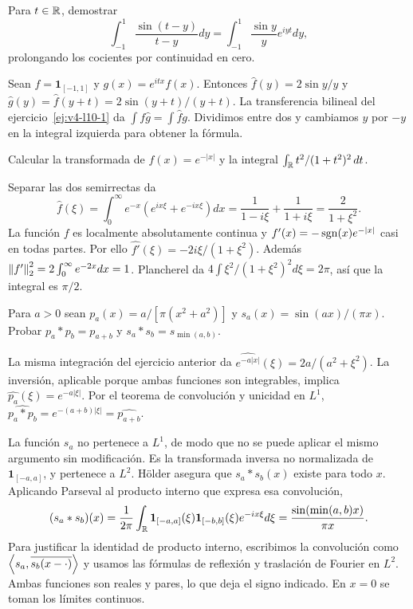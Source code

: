 \begin{ejercicio}\label{ej:v4-l13-1}
Para $t\in\mathbb R$, demostrar
\[
 \int_{-1}^1\frac{\sin(t-y)}{t-y}dy
 =\int_{-1}^1\frac{\sin y}{y}e^{iyt}dy,
\]
prolongando los cocientes por continuidad en cero.
\end{ejercicio}
\begin{solucion}
Sean $f=\mathbf1_{[-1,1]}$ y $g(x)=e^{itx}f(x)$. Entonces $\widehat f(y)=2\sin y/y$ y $\widehat g(y)=\widehat f(y+t)=2\sin(y+t)/(y+t)$. La transferencia bilineal del ejercicio~\ref{ej:v4-l10-1} da $\int f\widehat g=\int\widehat f g$. Dividimos entre dos y cambiamos $y$ por $-y$ en la integral izquierda para obtener la fórmula.
\end{solucion}

\begin{ejercicio}\label{ej:v4-l13-2}
Calcular la transformada de $f(x)=e^{-|x|}$ y la integral $\int_\mathbb R t^2/(1+t^2)^2\,dt$.
\end{ejercicio}
\begin{solucion}
Separar las dos semirrectas da
\[
 \widehat f(\xi)=\int_0^\infty e^{-x}(e^{ix\xi}+e^{-ix\xi})dx
 =\frac1{1-i\xi}+\frac1{1+i\xi}=\frac2{1+\xi^2}.
\]
La función $f$ es localmente absolutamente continua y $f'(x)=-\operatorname{sgn}(x)e^{-|x|}$ casi en todas partes. Por ello $\widehat{f'}(\xi)=-2i\xi/(1+\xi^2)$. Además $\left\lVert f'\right\rVert_2^2=2\int_0^\infty e^{-2x}dx=1$. Plancherel da $4\int\xi^2/(1+\xi^2)^2d\xi=2\pi$, así que la integral es $\pi/2$.
\end{solucion}

\begin{ejercicio}\label{ej:v4-l13-3}
Para $a>0$ sean $p_a(x)=a/[\pi(x^2+a^2)]$ y $s_a(x)=\sin(ax)/(\pi x)$. Probar $p_a*p_b=p_{a+b}$ y $s_a*s_b=s_{\min(a,b)}$.
\end{ejercicio}
\begin{solucion}
La misma integración del ejercicio anterior da $\widehat{e^{-a|x|}}(\xi)=2a/(a^2+\xi^2)$. La inversión, aplicable porque ambas funciones son integrables, implica $\widehat{p_a}(\xi)=e^{-a|\xi|}$. Por el teorema de convolución y unicidad en $L^1$, $\widehat{p_a*p_b}=e^{-(a+b)|\xi|}=\widehat{p_{a+b}}$.

La función $s_a$ no pertenece a $L^1$, de modo que no se puede aplicar el mismo argumento sin modificación. Es la transformada inversa no normalizada de $\mathbf1_{[-a,a]}$, y pertenece a $L^2$. Hölder asegura que $s_a*s_b(x)$ existe para todo $x$. Aplicando Parseval al producto interno que expresa esa convolución,
\[
 (s_a*s_b)(x)=\frac1{2\pi}\int_{\mathbb R}\mathbf1_{[-a,a]}(\xi)\mathbf1_{[-b,b]}(\xi)e^{-ix\xi}d\xi
 =\frac{\sin(\min(a,b)x)}{\pi x}.
\]
Para justificar la identidad de producto interno, escribimos la convolución como $\left\langle s_a,\overline{s_b(x-\cdot)}\right\rangle$ y usamos las fórmulas de reflexión y traslación de Fourier en $L^2$. Ambas funciones son reales y pares, lo que deja el signo indicado. En $x=0$ se toman los límites continuos.
\end{solucion}

